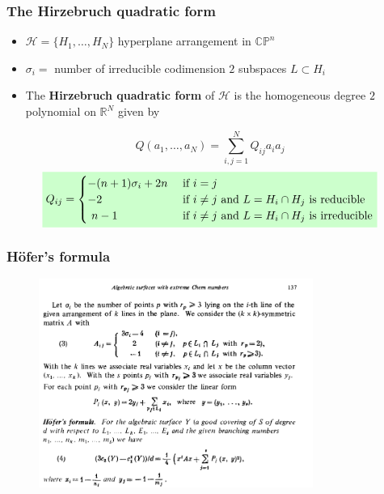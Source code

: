 \documentclass{beamer}
\newcommand{\R}{\mathbb{R}}
\newcommand{\CP}{\mathbb{CP}}
\newcommand{\mH}{\mathcal{H}}
\newcommand{\mathcolorbox}[2]{\colorbox{#1}{$\displaystyle #2$}}
\begin{document}
\begin{frame}
	\frametitle{The Hirzebruch quadratic form}
	\begin{itemize}
		\item \(\mH = \{H_1, \ldots, H_N\}\) hyperplane arrangement in \(\CP^n\)
		\item \(\sigma_i = \) number of irreducible codimension \(2\) subspaces \(L \subset H_i\)
		\item The \textbf{Hirzebruch quadratic form} of \(\mH\) is the homogeneous degree \(2\) polynomial on \(\R^N\) given by
	\end{itemize}
	\[
	Q(a_1, \ldots, a_N) = \sum_{i,j = 1}^N Q_{ij} a_i a_j 
	\]
	\[
	\mathcolorbox{green!20}{
	Q_{ij} = \begin{cases}
		- (n+1) \sigma_i + 2n &\text{ if } i = j  \\
		-2 &\text{ if }  i \neq j \text{ and } L = H_i \cap H_j \text{ is reducible} \\
		\,\, n-1 &\text{ if } i \neq j \text{ and } L = H_i \cap H_j \text{ is irreducible} 
	\end{cases}
}
	\]
\end{frame}


\begin{frame}
	\frametitle{H\"ofer's formula}
	\begin{center}
		\begin{figure}
			\includegraphics[width=0.8\textwidth,height=0.8\textheight,keepaspectratio]{hofer}
		\end{figure}
	\end{center}
\end{frame}
\end{document}
